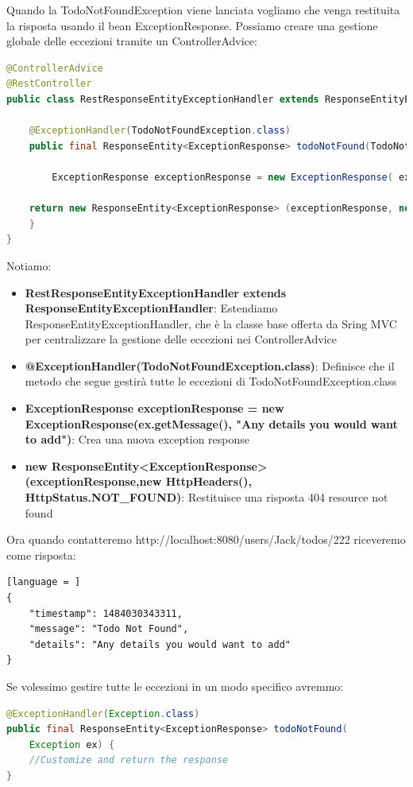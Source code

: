 \documentclass[11pt,a4paper]{book}
\begin{document}
Quando la TodoNotFoundException viene lanciata vogliamo che venga restituita la risposta usando il bean ExceptionResponse. Possiamo creare una gestione globale delle eccezioni tramite un ControllerAdvice:
\begin{lstlisting}[language = Java]
@ControllerAdvice
@RestController
public class RestResponseEntityExceptionHandler extends ResponseEntityExceptionHandler{

	@ExceptionHandler(TodoNotFoundException.class)
	public final ResponseEntity<ExceptionResponse> todoNotFound(TodoNotFoundException ex) {
		
		ExceptionResponse exceptionResponse = new ExceptionResponse( ex.getMessage(), "Any details you would want to add");
	
	return new ResponseEntity<ExceptionResponse> (exceptionResponse, new HttpHeaders() HttpStatus.NOT_FOUND);
	}
}
\end{lstlisting}

Notiamo:
\begin{itemize}
	\item \textbf{RestResponseEntityExceptionHandler extends \\
		ResponseEntityExceptionHandler}: Estendiamo ResponseEntityExceptionHandler, che è la classe base offerta da Sring MVC per centralizzare la gestione delle eccezioni nei ControllerAdvice
	\item \textbf{@ExceptionHandler(TodoNotFoundException.class)}: Definisce che il metodo che segue gestirà tutte le eccezioni di TodoNotFoundException.class
	\item \textbf{ExceptionResponse exceptionResponse = new \\
		ExceptionResponse(ex.getMessage(), 
		"Any details you would want to add")}: Crea una nuova exception response
	\item \textbf{new ResponseEntity<ExceptionResponse>
		(exceptionResponse,new HttpHeaders(), 
		HttpStatus.NOT\_FOUND)}: Restituisce una risposta 404 resource not found
\end{itemize}

Ora quando contatteremo http://localhost:8080/users/Jack/todos/222 riceveremo come risposta:
\begin{lstlisting}[language = ]
{
	"timestamp": 1484030343311,
	"message": "Todo Not Found",
	"details": "Any details you would want to add"
}
\end{lstlisting}

Se volessimo gestire tutte le eccezioni in un modo specifico avremmo:
\begin{lstlisting}[language = Java]
@ExceptionHandler(Exception.class)
public final ResponseEntity<ExceptionResponse> todoNotFound(
	Exception ex) {
	//Customize and return the response
}
\end{lstlisting}
\end{document}
